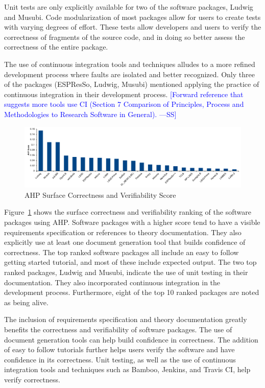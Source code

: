 \documentclass[final, 3p, times, authoryear]{elsarticle}
\newcommand{\authornote}[3]{\textcolor{#1}{[#3 ---#2]}}
\newcommand{\authornote}[3]{}
\newcommand{\wss}[1]{\authornote{blue}{SS}{#1}} %
\begin{document}
Unit tests are only explicitly available for two of the software packages,
Ludwig and Musubi. Code modularization of most packages allow for users to create tests with varying degrees of effort. These tests allow developers and users to verify the correctness of fragments of the source code, and in doing so better assess the correctness of the entire package.

The use of continuous integration tools and techniques alludes to a more refined
development process where faults are isolated and better recognized. Only three
of the packages (ESPResSo, Ludwig, Musubi) mentioned applying the practice of
continuous integration in their development process. \wss{Forward reference that
suggests more tools use CI (Section 7 Comparison of Principles, Process and
Methodologies to Research Software in General).}

\begin{figure}[h!]
	\begin{center}
		\includegraphics[width=1.0\textwidth]{./figures/correctnessverifiability.pdf}
		\caption{AHP Surface Correctness and Verifiability Score}
		\label{Fig_CorrectnessVerifiability}
	\end{center}
\end{figure}

Figure~\ref{Fig_CorrectnessVerifiability} shows the surface correctness and
verifiability ranking of the software packages using AHP. Software packages with
a higher score tend to have a visible requirements specification or references
to theory documentation. They also explicitly use at least one document
generation tool that builds confidence of correctness. The top ranked software
packages all include an easy to follow getting started tutorial, and most of
these include expected output. The two top ranked packages, Ludwig and Musubi, indicate the use of unit testing in their documentation. They also incorporated continuous integration in the development process. Furthermore, eight of the top 10 ranked packages are noted as being alive.

The inclusion of requirements specification and theory documentation greatly
benefits the correctness and verifiability of software packages. The use of
document generation tools can help build confidence in correctness. The addition
of easy to follow tutorials further helps users verify the software and have
confidence in its correctness. Unit testing, as well as the use of continuous
integration tools and techniques such as Bamboo, Jenkins, and Travis CI, help
verify correctness.
\end{document}

